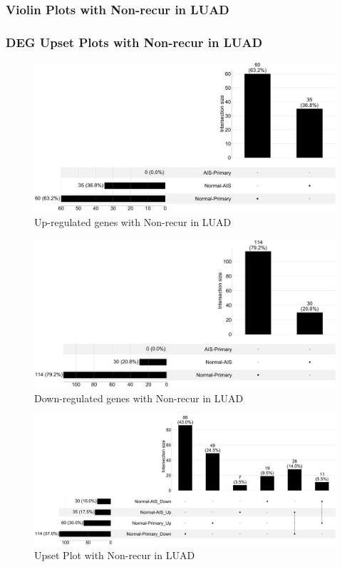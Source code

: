 \documentclass{beamer}
\begin{document}
    \begin{frame}[allowframebreaks]
        \frametitle{Violin Plots with Non-recur in LUAD}
    \end{frame}

    \begin{frame}[allowframebreaks]
        \frametitle{DEG Upset Plots with Non-recur in LUAD}

        \begin{figure}
            \includegraphics[width=0.8 \linewidth]{figures/DEG/Pair-Venn/STAR.FPKM.ADC.Nonrecur.Up.venn.pdf}
            \caption{Up-regulated genes with Non-recur in LUAD}
        \end{figure}

        \begin{figure}
            \includegraphics[width=0.8 \linewidth]{figures/DEG/Pair-Venn/STAR.FPKM.ADC.Nonrecur.Down.venn.pdf}
            \caption{Down-regulated genes with Non-recur in LUAD}
        \end{figure}

        \begin{figure}
            \includegraphics[width=0.3 \linewidth]{figures/DEG/Pair-Venn/STAR.FPKM.ADC.Nonrecur.venn.pdf}
            \caption{Upset Plot with Non-recur in LUAD}
        \end{figure}
    \end{frame}
\end{document}
